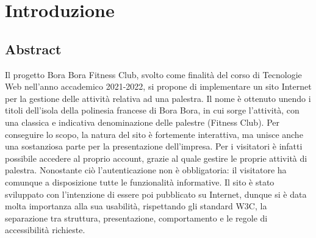 \documentclass[a4paper]{article}
\begin{document}
	\renewcommand{\contentsname}{Indice}
	\tableofcontents
    \pagebreak

    \section{Introduzione}
    \subsection{Abstract}
    Il progetto Bora Bora Fitness Club, svolto come finalità del corso di Tecnologie Web nell’anno accademico 2021-2022, si propone di implementare un sito Internet per la gestione delle attività relativa ad una palestra. Il nome è ottenuto unendo i titoli dell’isola della polinesia francese di Bora Bora, in cui sorge l’attività, con una classica e indicativa denominazione delle palestre (Fitness Club). Per conseguire lo scopo, la natura del sito è fortemente interattiva, ma unisce anche una sostanziosa parte per la presentazione dell’impresa. Per i visitatori è infatti possibile accedere al proprio account, grazie al quale gestire le proprie attività di palestra. Nonostante ciò l’autenticazione non è obbligatoria: il visitatore ha comunque a disposizione tutte le funzionalità informative. Il sito è stato sviluppato con l’intenzione di essere poi pubblicato su Internet, dunque si è data molta importanza alla sua usabilità, rispettando gli standard W3C, la separazione tra struttura, presentazione, comportamento e le regole di accessibilità richieste.
\end{document}
